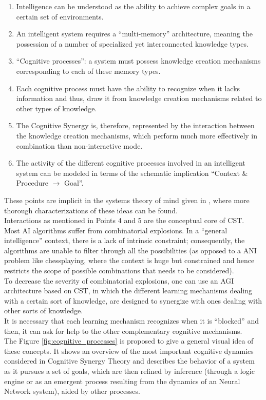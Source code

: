 \begin{enumerate}
	\item Intelligence can be understood as the ability to achieve complex goals in a certain set of environments. 
	\item An intelligent system requires a \enquote{multi-memory} architecture, meaning the possession of a number of specialized yet interconnected knowledge types.
	\item \enquote{Cognitive processes}: a system must possess knowledge creation mechanisms corresponding to each of these memory types.
	\item Each cognitive process must have the ability to recognize when it lacks information and thus, draw it from knowledge creation mechanisms related to other types of knowledge.
	\item The Cognitive Synergy is, therefore, represented by the interaction between the knowledge creation mechanisms, which perform much more effectively in combination than non-interactive mode. 
	\item The activity of the different cognitive processes involved in an intelligent system can be modeled in terms of the schematic implication \enquote{Context \& Procedure $\rightarrow$ Goal}.
\end{enumerate}

These points are implicit in the systems theory of mind given in \cite{goertzel2006the}, where more thorough characterizations of these ideas can be found.\\
Interactions as mentioned in Points 4 and 5 are the conceptual core of CST. \\
Most AI algorithms suffer from combinatorial explosions. In a “general intelligence” context, there is a lack of intrinsic constraint; consequently, the algorithms are unable to filter through all the possibilities (as opposed to a ANI problem like chessplaying, where the context is huge but constrained and hence restricts the scope of possible combinations that needs to be considered). \\
To decrease the severity of combinatorial explosions, one can use an AGI architecture based on CST, in which the different learning mechanisms dealing with a certain sort of knowledge, are designed to synergize with ones dealing with other sorts of knowledge. \\
It is necessary that each learning mechanism recognizes when it is \enquote{blocked} and then, it can ask for help to the other complementary cognitive mechanisms. \\
The Figure \ref{fig:cognitive_processes} is proposed to give a general visual idea of these concepts. It shows an overview of the most important cognitive dynamics considered in Cognitive Synergy Theory and describes the behavior of a system as it pursues a set of goals, which are then refined by inference (through a logic engine or as an emergent process resulting from the dynamics of an Neural Network system), aided by other processes. \\


